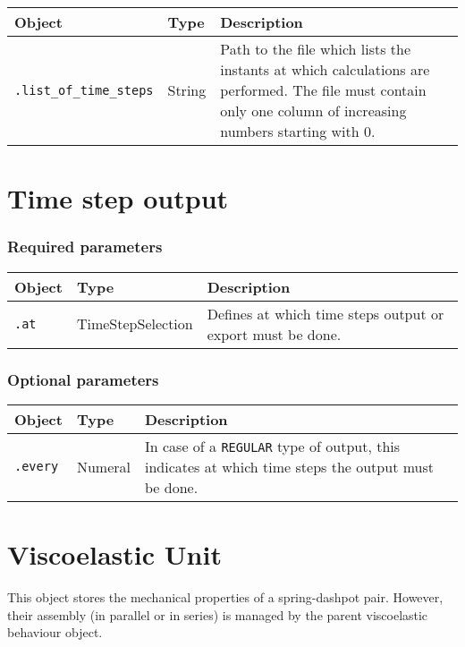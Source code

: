 \documentclass[10pt]{article}
\begin{document}
\begin{tabularx}{\textwidth}{llX}
\hline 
Object & Type & Description \\ 
\hline 
\verb+.list_of_time_steps+ & String & Path to the file which lists the instants at which calculations are performed. The file must contain only one column of increasing numbers starting with 0.\\ 
\hline 
\end{tabularx}

\section{Time step output}

\subsubsection*{Required parameters}

\begin{tabularx}{\textwidth}{llX}
\hline 
Object & Type & Description \\ 
\hline 
\verb+.at+ & TimeStepSelection & Defines at which time steps output or export must be done. \\ 
\hline 
\end{tabularx}

\subsubsection*{Optional parameters}

\begin{tabularx}{\textwidth}{llX}
\hline 
Object & Type & Description \\ 
\hline 
\verb+.every+ & Numeral & In case of a \verb+REGULAR+ type of output, this indicates at which time steps the output must be done.\\
\hline 
\end{tabularx}








\section{Viscoelastic Unit}

This object stores the mechanical properties of a spring-dashpot pair. However, their assembly (in parallel or in series) is managed by the parent viscoelastic behaviour object.
\end{document}
